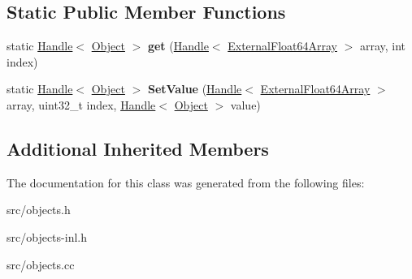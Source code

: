 \subsection*{Static Public Member Functions}
\begin{DoxyCompactItemize}
\item 
\hypertarget{classv8_1_1internal_1_1_external_float64_array_a41397e223a5d4127d8f76373907dac59}{}static \hyperlink{classv8_1_1internal_1_1_handle}{Handle}$<$ \hyperlink{classv8_1_1internal_1_1_object}{Object} $>$ {\bfseries get} (\hyperlink{classv8_1_1internal_1_1_handle}{Handle}$<$ \hyperlink{classv8_1_1internal_1_1_external_float64_array}{External\+Float64\+Array} $>$ array, int index)\label{classv8_1_1internal_1_1_external_float64_array_a41397e223a5d4127d8f76373907dac59}

\item 
\hypertarget{classv8_1_1internal_1_1_external_float64_array_a12a75e91b857b5e5428393da4167b706}{}static \hyperlink{classv8_1_1internal_1_1_handle}{Handle}$<$ \hyperlink{classv8_1_1internal_1_1_object}{Object} $>$ {\bfseries Set\+Value} (\hyperlink{classv8_1_1internal_1_1_handle}{Handle}$<$ \hyperlink{classv8_1_1internal_1_1_external_float64_array}{External\+Float64\+Array} $>$ array, uint32\+\_\+t index, \hyperlink{classv8_1_1internal_1_1_handle}{Handle}$<$ \hyperlink{classv8_1_1internal_1_1_object}{Object} $>$ value)\label{classv8_1_1internal_1_1_external_float64_array_a12a75e91b857b5e5428393da4167b706}

\end{DoxyCompactItemize}
\subsection*{Additional Inherited Members}


The documentation for this class was generated from the following files\+:\begin{DoxyCompactItemize}
\item 
src/objects.\+h\item 
src/objects-\/inl.\+h\item 
src/objects.\+cc\end{DoxyCompactItemize}
